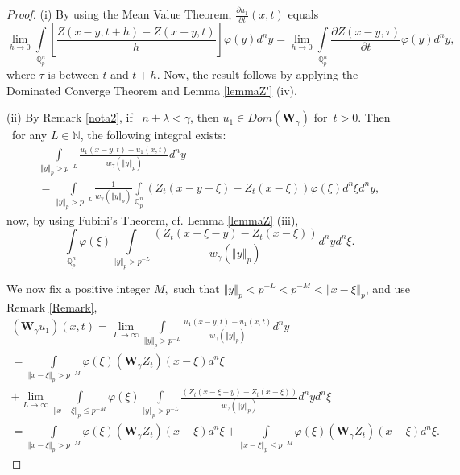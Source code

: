 \documentclass{amsart}\usepackage{amsfonts}
\theoremstyle{plain}
\numberwithin{equation}{section}
\begin{document}
\begin{proof}
(i) By using the Mean Value Theorem, $\frac{\partial u_{1}}{\partial t}(x,t)$
equals\[
\lim_{h\rightarrow0}\underset{\mathbb{Q}_{p}^{n}}{\int}\left[  \frac
{Z(x-y,t+h)-Z(x-y,t)}{h}\right]  \varphi(y)d^{n}y=\lim_{h\rightarrow
0}\underset{\mathbb{Q}_{p}^{n}}{\int}\frac{\partial Z(x-y,\tau)}{\partial
t}\varphi(y)d^{n}y,
\]
where $\tau$ is between $t$ and $t+h$. Now, the result follows by applying the
Dominated Converge Theorem and Lemma \ref{lemmaZ'} (iv).

(ii) By Remark \ref{nota2}, if \ $n+\lambda<\gamma$, then $u_{1}\in
Dom(\mathbf{W}_{\gamma})$ for\ $t>0$. Then \ for any $L\in\mathbb{N}$, the
following integral exists:\begin{multline*}
\underset{\left\Vert y\right\Vert _{p}>p^{-L}}{\int}\frac{u_{1}(x-y,t)-u_{1}(x,t)}{w_{\gamma}(\left\Vert y\right\Vert _{p})}d^{n}y\\
=\underset{\left\Vert y\right\Vert _{p}>p^{-L}}{\int}\frac{1}{w_{\gamma
}(\left\Vert y\right\Vert _{p})}\underset{\mathbb{Q}_{p}^{n}}{\int}\left(
Z_{t}(x-y-\xi)-Z_{t}(x-\xi)\right)  \varphi(\xi)d^{n}\xi d^{n}y,
\end{multline*}
now, by using Fubini's Theorem, cf. Lemma \ref{lemmaZ} (iii),
\[
\underset{\mathbb{Q}_{p}^{n}}{\int}\varphi(\xi)\underset{\left\Vert
y\right\Vert _{p}>p^{-L}}{\int}\frac{\left(  Z_{t}(x-\xi-y)-Z_{t}(x-\xi)\right)  }{w_{\gamma}(\left\Vert y\right\Vert _{p})}d^{n}yd^{n}\xi.
\]


We now fix a positive integer $M$,\ such that $\left\Vert y\right\Vert
_{p}<p^{-L}<p^{-M}<\left\Vert x-\xi\right\Vert _{p}$, and use Remark
\ref{Remark},\begin{multline*}
(\boldsymbol{W}_{\gamma}u_{1})(x,t)=\lim_{L\rightarrow\infty}\underset
{\left\Vert y\right\Vert _{p}>p^{-L}}{\int}\frac{u_{1}(x-y,t)-u_{1}(x,t)}{w_{\gamma}(\left\Vert y\right\Vert _{p})}d^{n}y\\
=\underset{\left\Vert x-\xi\right\Vert _{p}>p^{-M}}{\int}\varphi
(\xi)(\boldsymbol{W}_{\gamma}Z_{t})(x-\xi)d^{n}\xi\\
+\lim_{L\rightarrow\infty}\underset{\left\Vert x-\xi\right\Vert _{p}\leq
p^{-M}}{\int}\varphi(\xi)\underset{\left\Vert y\right\Vert _{p}>p^{-L}}{\int
}\frac{\left(  Z_{t}(x-\xi-y)-Z_{t}(x-\xi)\right)  }{w_{\gamma}(\left\Vert
y\right\Vert _{p})}d^{n}yd^{n}\xi\\
=\underset{\left\Vert x-\xi\right\Vert _{p}>p^{-M}}{\int}\varphi
(\xi)(\boldsymbol{W}_{\gamma}Z_{t})(x-\xi)d^{n}\xi+\underset{\left\Vert
x-\xi\right\Vert _{p}\leq p^{-M}}{\int}\varphi(\xi)(\boldsymbol{W}_{\gamma
}Z_{t})(x-\xi)d^{n}\xi.
\end{multline*}

\end{proof}
\end{document}
